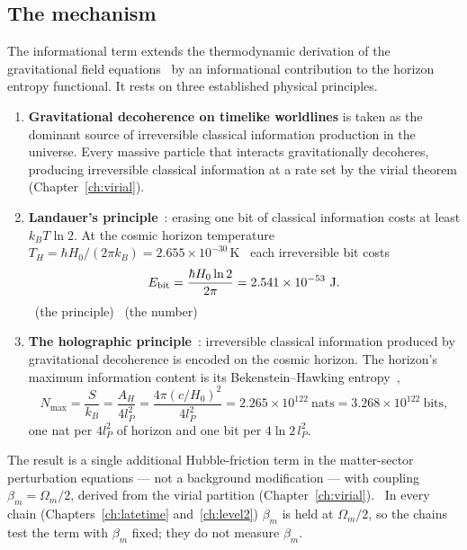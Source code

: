 \subsection{The mechanism}
The informational term extends the thermodynamic derivation of the gravitational field equations~\cite{Jacobson1995} by an
informational contribution to the horizon entropy functional. It rests on three established physical principles.
\begin{enumerate}
\item \textbf{Gravitational decoherence on timelike worldlines} is taken as the dominant source of irreversible classical information
production in the universe. Every massive particle that interacts gravitationally decoheres, producing irreversible classical
information at a rate set by the virial theorem (Chapter~\ref{ch:virial}). \interp
\item \textbf{Landauer's principle}~\cite{Landauer1961}: erasing one bit of classical information costs at least $k_BT\ln2$. At the
cosmic horizon temperature $T_H=\hbar H_0/(2\pi k_B)=2.655\times10^{-30}$\,K~\cite{GibbonsHawking1977} each irreversible bit costs
\begin{equation}E_{\rm bit}=\frac{\hbar H_0\ln2}{2\pi}=2.541\times10^{-53}\ {\rm J}.\label{eq:lam_ebit}\end{equation}
\derived\ (the principle) \calc\ (the number)
\item \textbf{The holographic principle}~\cite{tHooft1993,Susskind1995}: irreversible classical information produced by gravitational
decoherence is encoded on the cosmic horizon. The horizon's maximum information content is its Bekenstein--Hawking
entropy~\cite{Bekenstein1973,Hawking1975},
\begin{equation}
N_{\max}=\frac{S}{k_B}=\frac{A_H}{4l_P^2}=\frac{4\pi(c/H_0)^2}{4l_P^2}=2.265\times10^{122}\ \text{nats}=3.268\times10^{122}\ \text{bits},
\label{eq:lam_nmax}\end{equation}
one nat per $4l_P^2$ of horizon and one bit per $4\ln2\,l_P^2$. \derived\ \calc
\end{enumerate}
The result is a single additional Hubble-friction term in the matter-sector perturbation equations --- not a background modification
--- with coupling $\beta_m=\Omega_m/2$, derived from the virial partition (Chapter~\ref{ch:virial}). \derived\ In every chain
(Chapters~\ref{ch:latetime} and~\ref{ch:level2}) $\beta_m$ is held at $\Omega_m/2$, so the chains test the term with $\beta_m$ fixed;
they do not measure $\beta_m$.

